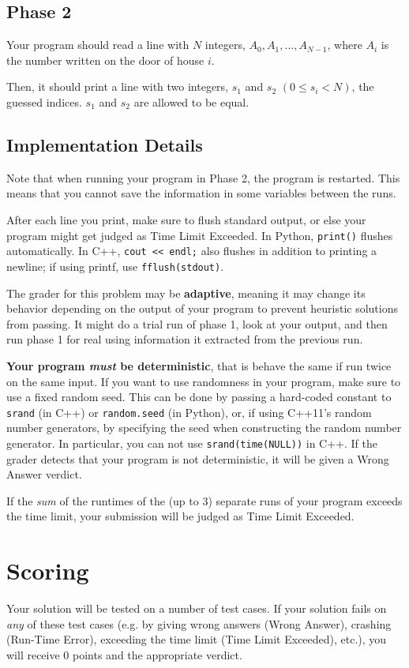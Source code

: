 \subsection*{Phase 2}
Your program should read a line with $N$ integers, $A_0, A_1, \ldots, A_{N-1}$, 
where $A_i$ is the number written on the door of house $i$.

Then, it should print a line with two integers, $s_1$ and $s_2$ $(0 \le s_i < N)$, the guessed indices.
$s_1$ and $s_2$ are allowed to be equal.

\subsection*{Implementation Details}

Note that when running your program in Phase 2, the program is restarted. 
This means that you cannot save the information in some variables between the runs. 

After each line you print, make sure to flush standard output, or else your program might get judged as Time Limit Exceeded.
In Python, \verb|print()| flushes automatically. In C++, \verb|cout << endl;| also flushes in addition to printing a newline; 
if using printf, use \verb|fflush(stdout)|.

The grader for this problem may be \textbf{adaptive}, meaning it may change its behavior depending on the output 
of your program to prevent heuristic solutions from passing.
It might do a trial run of phase 1, look at your output, and then run phase 1 for real using 
information it extracted from the previous run. 


\textbf{Your program \emph{must} be deterministic}, that is behave the same if run twice on the same input.
If you want to use randomness in your program, make sure to use a fixed random seed.
This can be done by passing a hard-coded constant to \verb|srand| (in C++) or \verb|random.seed| (in Python), 
or, if using C++11's random number generators, by specifying the seed when constructing the random number generator. 
In particular, you can not use \verb|srand(time(NULL))| in C++.
If the grader detects that your program is not deterministic, it will be given a Wrong Answer verdict.

If the \emph{sum} of the runtimes of the (up to $3$) separate runs of your program exceeds the time limit, 
your submission will be judged as Time Limit Exceeded.

\section*{Scoring}
Your solution will be tested on a number of test cases.
If your solution fails on \emph{any} of these test cases (e.g. by giving wrong answers (Wrong Answer), crashing (Run-Time Error), exceeding the time limit (Time Limit Exceeded), etc.), 
you will receive $0$ points and the appropriate verdict.

